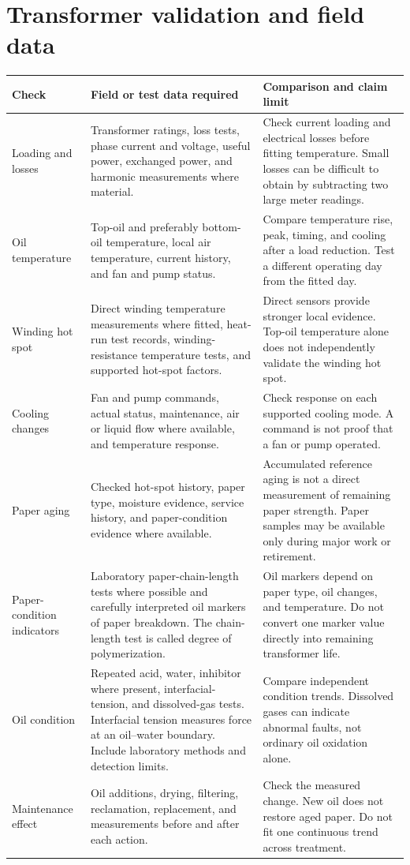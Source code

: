 \documentclass[11pt,a4paper]{report}
\begin{document}
\section{Transformer validation and field data}
\begin{longtable}{L{0.18\textwidth}L{0.35\textwidth}L{0.35\textwidth}}
\toprule Check & Field or test data required & Comparison and claim limit \\ \midrule\endhead
Loading and losses & Transformer ratings, loss tests, phase current and voltage, useful power, exchanged power, and harmonic measurements where material. & Check current loading and electrical losses before fitting temperature. Small losses can be difficult to obtain by subtracting two large meter readings. \\
Oil temperature & Top-oil and preferably bottom-oil temperature, local air temperature, current history, and fan and pump status. & Compare temperature rise, peak, timing, and cooling after a load reduction. Test a different operating day from the fitted day. \\
Winding hot spot & Direct winding temperature measurements where fitted, heat-run test records, winding-resistance temperature tests, and supported hot-spot factors. & Direct sensors provide stronger local evidence. Top-oil temperature alone does not independently validate the winding hot spot. \\
Cooling changes & Fan and pump commands, actual status, maintenance, air or liquid flow where available, and temperature response. & Check response on each supported cooling mode. A command is not proof that a fan or pump operated. \\
Paper aging & Checked hot-spot history, paper type, moisture evidence, service history, and paper-condition evidence where available. & Accumulated reference aging is not a direct measurement of remaining paper strength. Paper samples may be available only during major work or retirement. \\
Paper-condition indicators & Laboratory paper-chain-length tests where possible and carefully interpreted oil markers of paper breakdown. The chain-length test is called degree of polymerization. & Oil markers depend on paper type, oil changes, and temperature. Do not convert one marker value directly into remaining transformer life. \\
Oil condition & Repeated acid, water, inhibitor where present, interfacial-tension, and dissolved-gas tests. Interfacial tension measures force at an oil--water boundary. Include laboratory methods and detection limits. & Compare independent condition trends. Dissolved gases can indicate abnormal faults, not ordinary oil oxidation alone. \\
Maintenance effect & Oil additions, drying, filtering, reclamation, replacement, and measurements before and after each action. & Check the measured change. New oil does not restore aged paper. Do not fit one continuous trend across treatment. \\
\bottomrule
\end{longtable}
\end{document}
